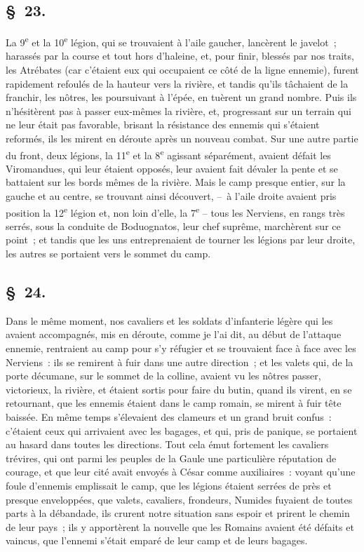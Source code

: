 \documentclass[french,twoside]{book} %
\begin{document}
\subsection[{§ 23.}]{ \textsc{§ 23.} }
\noindent La 9\textsuperscript{e} et la 10\textsuperscript{e} légion, qui se trouvaient à l’aile gaucher, lancèrent le javelot ; harassés par la course et tout hors d’haleine, et, pour finir, blessés par nos traits, les Atrébates (car c’étaient eux qui occupaient ce côté de la ligne ennemie), furent rapidement refoulés de la hauteur vers la rivière, et tandis qu’ils tâchaient de la franchir, les nôtres, les poursuivant à l’épée, en tuèrent un grand nombre. Puis ils n’hésitèrent pas à passer eux-mêmes la rivière, et, progressant sur un terrain qui ne leur était pas favorable, brisant la résistance des ennemis qui s’étaient reformés, ils les mirent en déroute après un nouveau combat. Sur une autre partie du front, deux légions, la 11\textsuperscript{e} et la 8\textsuperscript{e} agissant séparément, avaient défait les Viromandues, qui leur étaient opposés, leur avaient fait dévaler la pente et se battaient sur les bords mêmes de la rivière. Mais le camp presque entier, sur la gauche et au centre, se trouvant ainsi découvert, – à l’aile droite avaient pris position la 12\textsuperscript{e} légion et, non loin d’elle, la 7\textsuperscript{e} – tous les Nerviens, en rangs très serrés, sous la conduite de Boduognatos, leur chef suprême, marchèrent sur ce point ; et tandis que les uns entreprenaient de tourner les légions par leur droite, les autres se portaient vers le sommet du camp.
\subsection[{§ 24.}]{ \textsc{§ 24.} }
\noindent Dans le même moment, nos cavaliers et les soldats d’infanterie légère qui les avaient accompagnés, mis en déroute, comme je l’ai dit, au début de l’attaque ennemie, rentraient au camp pour s’y réfugier et se trouvaient face à face avec les Nerviens : ils se remirent à fuir dans une autre direction ; et les valets qui, de la porte décumane, sur le sommet de la colline, avaient vu les nôtres passer, victorieux, la rivière, et étaient sortis pour faire du butin, quand ils virent, en se retournant, que les ennemis étaient dans le camp romain, se mirent à fuir tête baissée. En même temps s’élevaient des clameurs et un grand bruit confus : c’étaient ceux qui arrivaient avec les bagages, et qui, pris de panique, se portaient au hasard dans toutes les directions. Tout cela émut fortement les cavaliers trévires, qui ont parmi les peuples de la Gaule une particulière réputation de courage, et que leur cité avait envoyés à César comme auxiliaires : voyant qu’une foule d’ennemis emplissait le camp, que les légions étaient serrées de près et presque enveloppées, que valets, cavaliers, frondeurs, Numides fuyaient de toutes parts à la débandade, ils crurent notre situation sans espoir et prirent le chemin de leur pays ; ils y apportèrent la nouvelle que les Romains avaient été défaits et vaincus, que l’ennemi s’était emparé de leur camp et de leurs bagages.
\end{document}
